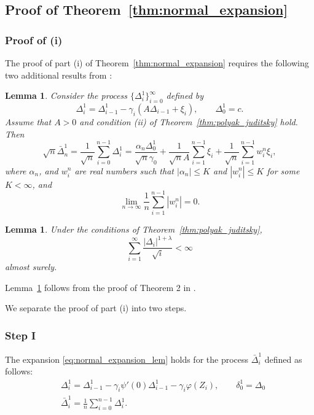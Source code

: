 \documentclass[letterpaper, 11pt]{IEEEtran}      %
\newtheorem{lem}[thm]{\bf {Lemma}}
\begin{document}
{\color{red}

\subsection{Proof of Theorem~\ref{thm:normal_expansion}
\label{proof:thm:normal_expansion}
}
\subsubsection*{Proof of (i)}
The proof of part (i) of Theorem~\ref{thm:normal_expansion} requires the following two additional results from \cite{polyak1992acceleration}:
\begin{lem}{\cite[Lem. 2]{polyak1992acceleration}}
\label{lem:Polyak_expansion}
Consider the process $\{\Delta_i^1 \}_{i=0}^\infty$ defined by
\[
\Delta^1_i = \Delta^1_{i-1} - \gamma_i (A \Delta_{i-1}+ \xi_i),\qquad \Delta_{0}^1 = c.
\]
Assume that $A>0$ and condition (ii) of Theorem~\ref{thm:polyak_juditsky} hold. Then 
\begin{equation}
\label{eq:Polyak_expansion}
\sqrt{n} \bar{\Delta}_n^1 = \frac{1}{\sqrt{n}}\sum_{i=0}^{n-1} \Delta_i^1 = \frac{\alpha_n \Delta_0^1}{\sqrt{n} \gamma_0}  + \frac{1}{\sqrt{n} A} \sum_{i=1}^{n-1} \xi_i + \frac{1}{\sqrt{n}}\sum_{i=1}^{n-1} w_i^n \xi_i,
\end{equation}
where $\alpha_n$, and $w_i^n$ are real numbers such that $|\alpha_n| \leq K$ and $|w_i^n|\leq K$ for some $K< \infty$, and 
\[
\lim_{n\to \infty} \frac{1}{n} \sum_{i=1}^{n-1} |w_i^n| = 0. 
\]
\end{lem} 

\begin{lem} \label{lem:PJ_converging_sum}
Under the conditions of Theorem~\ref{thm:polyak_juditsky},
\[
\sum_{i=1}^\infty \frac{|\Delta_{i}|^{1+\lambda}}{\sqrt{i}} < \infty 
\]
almost surely. 
\end{lem}
Lemma~\ref{lem:PJ_converging_sum} follows from the proof of Theorem 2 in \cite{polyak1992acceleration}. 

We separate the proof of part (i) into two steps.
\subsubsection*{Step I}
The expansion \eqref{eq:normal_expansion_lem} holds for the process  ${\bar{\Delta}^1_i}$ defined as follows:
\begin{align} \label{eq:Polyak_expansion_lem1_alg}
& \Delta_i^1  = \Delta_{i-1}^1 - \gamma_i \psi'(0) \Delta_{i-1}^1 - \gamma_i \varphi(Z_i), \qquad
 \delta_0^1 = \Delta_0\\
& \bar{\Delta}^1_i = \frac{1}{n}\sum_{i=0}^{n-1} \Delta^1_i.
\end{align}

}
\end{document}
